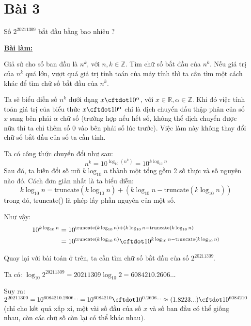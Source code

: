 \section*{Bài 3}

Số $2^{20211309}$ bắt đầu bằng bao nhiêu ?
	

\begin{center}
    \textbf{\underline{Bài làm:}}
\end{center}

Giả sử cho số ban đầu là $n^k$, với $n, k \in \mathbb{Z}$. Tìm chữ số bắt đầu của $n^k$. Nếu giá trị của $n^k$ quá lớn, vượt quá giá trị tính toán của máy tính thì ta cần tìm một cách khác để tìm chữ số bắt đầu của $n^k$.

Ta sẽ biểu diễn số $n^{k}$ dưới dạng $x \cftdot 10^\alpha$, với $x \in \mathbb{R}, \alpha \in \mathbb{Z}$. Khi đó việc tính toán giá trị của biểu thức $x \cftdot 10^\alpha$ chỉ là dịch chuyển dấu thập phân của số $x$ sang bên phải $\alpha$ chữ số (trường hợp nếu hết số, không thể dịch chuyển được nữa thì ta chỉ thêm số 0 vào bên phải số lúc trước). Việc làm này không thay đổi chữ số bắt đầu của số ta cần tính.

Ta có công thức chuyển đổi như sau:
$$n^k = 10^{\log_{10} \left( n^k \right)} = 10^{k \log_{10}n}$$
Sau đó, ta biến đổi số mũ $k \log_{10}n$ thành một tổng gồm 2 số thực và số nguyên nào đó. Cách đơn giản nhất là ta biểu diễn:
$$k \log_{10}n = \text{truncate}(k \log_{10}n) + \left( k \log_{10}n - \text{truncate}(k \log_{10}n) \right)$$
trong đó, truncate() là phép lấy phần nguyên của một số.

Như vậy:
\begin{align*}
10^{k \log_{10}n} & = 10^{\text{truncate}(k \log_{10}n) + \left( k \log_{10}n - \text{truncate}(k \log_{10}n \right)} \\
                  & = 10^{\text{truncate}\left( k \log_{10}n \right)} \cftdot 10^{k \log_{10}n - \text{truncate}(k \log_{10}n)}
\end{align*}

Quay lại với bài toán ở trên, ta cần tìm chữ số bắt đầu của số $2^{20211309}$.

Ta có: $\log_{10}2^{20211309} = 20211309\log_{10}2 = 6084210.2606...$

Suy ra: $2^{20211309} = 10^{6084210.2606...} = 10^{6084210} \cftdot 10^{0.2606...} \approx (1.8223...) \cftdot 10^{6084210}$ (chỉ cho kết quả xấp xỉ, một vài số đầu của số $x$ và số ban đầu có thể giống nhau, còn các chữ số còn lại có thể khác nhau).

